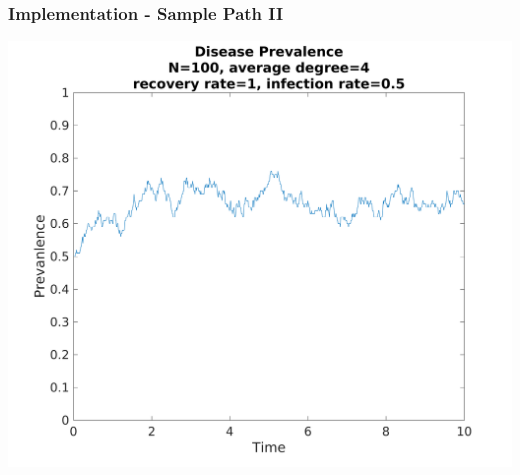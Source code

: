 \documentclass{beamer}
\begin{document}
\begin{frame}
 \frametitle{Implementation - Sample Path II}
\centering
\includegraphics[width=.75\textwidth]{samplepath10secnorew.png}
\end{frame}
\end{document}
